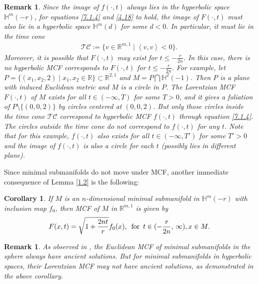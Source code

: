 \documentclass[12pt]{article}
\newtheorem{rmk}[lem]{Remark}
\newtheorem{cor}[lem]{Corollary}
\begin{document}
\begin{rmk} \label{rem:fF}
Since the image of $f(\cdot, t)$ always lies in the hyperbolic space $\mathbb{H}^{m}(- r)$,
for equations \eqref{7.1.4} and \eqref{4.18} to hold, the image of $F(\cdot, t)$ must also lie in a
hyperbolic space $\mathbb{H}^{m}(d)$ for some $d<0$. In particular, it must lie in the time cone
\begin{align} \label{eqn:timecone}
			\mathcal{TC} :=\{v\in  \mathbb R^{m,1}\mid \left<v,v\right><0\}.
\end{align}
Moreover, it is possible that $F(\cdot,t)$ may exist for $t\leq -\frac{r}{2n}$. In this case,
there is no hyperbolic MCF corresponds to $F(\cdot,t)$ for $t\leq -\frac{r}{2n}$.
For example,
let $P=\{ (x_1, x_2, 2) \mid x_1, x_2 \in \mathbb{R} \}  \subset \mathbb{R}^{2,1}$ and $M=P \bigcap \mathbb{H}^2(-1)$.
Then $P$ is a plane with induced Euclidean metric and $M$ is a circle in $P$.
The Lorentzian MCF $F(\cdot, t)$ of $M$ exists for all $t \in (-\infty, T)$ for some $T>0$, and it gives
a foliation of $P \setminus \{(0,0,2)\}$ by circles centered at $(0,0,2)$.
But only those circles inside the time cone $\mathcal{TC}$ correspond to
hyperbolic MCF $f(\cdot, t)$ through equation \eqref{7.1.4}. The circles outside the time cone
do not correspond to $f(\cdot, t)$ for any $t$. Note that for this example,
$f(\cdot, t)$ also exists for all $t \in (-\infty, T')$ for some $T'>0$
and the image of $f(\cdot, t)$ is also a circle  for each $t$
(possibly lies in different plane).
\end{rmk}		
			
	
Since minimal submanifolds do not move under MCF, another immediate consequence of Lemma \ref{1.2} is the following:	
\begin{cor} \label{2.6}
		If $M$ is an $n$-dimensional minimal submanifold in $\mathbb{H}^{m}(-r)$ with inclusion map $f_0$,
then MCF of $M$ in $\mathbb{R}^{m,1}$ is given by
		\begin{align*}
			F(x,t)=\sqrt{1+\frac{2nt}{r}}f_0(x), \,\,\, {\rm for} \,\,\, t \in (- \frac{r}{2n}, \, \infty), x \in M.
		\end{align*}
\end{cor}
	
	
\begin{rmk} \label{1.11}
   As observed in \cite{X.C}, the Euclidean MCF of minimal submanifolds in the sphere always have ancient solutions.
   But for minimal submanifolds in hyperbolic spaces, their Lorentzian MCF may not have ancient solutions, as demonstrated in the above corollary.
\end{rmk}
\end{document}
